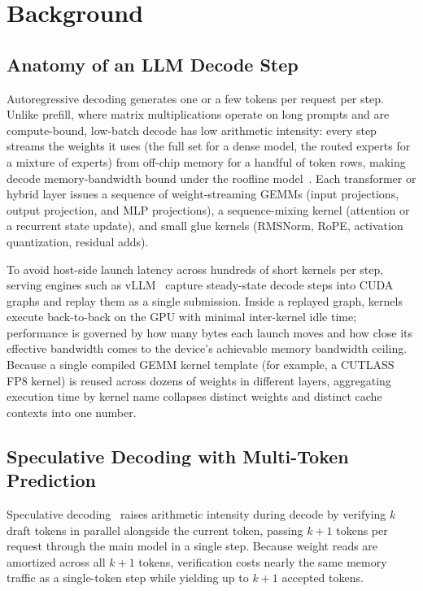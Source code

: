 \section{Background}\label{sec:background}

\subsection{Anatomy of an LLM Decode Step}

Autoregressive decoding generates one or a few tokens per request per step.
Unlike prefill, where matrix multiplications operate on long prompts and are compute-bound,
low-batch decode has low arithmetic intensity: every step streams the weights it uses (the full set for a dense model, the routed experts for a mixture of experts)
from off-chip memory for a handful of token rows, making decode memory-bandwidth bound
under the roofline model~\cite{williams2009roofline}.
Each transformer or hybrid layer issues a sequence of weight-streaming GEMMs
(input projections, output projection, and MLP projections), a sequence-mixing kernel
(attention or a recurrent state update), and small glue kernels (RMSNorm, RoPE,
activation quantization, residual adds).

To avoid host-side launch latency across hundreds of short kernels per step,
serving engines such as vLLM~\cite{kwon2023vllm} capture steady-state decode steps into
CUDA graphs and replay them as a single submission.
Inside a replayed graph, kernels execute back-to-back on the GPU with minimal inter-kernel
idle time; performance is governed by how many bytes each launch moves and how close its
effective bandwidth comes to the device's achievable memory bandwidth ceiling.
Because a single compiled GEMM kernel template (for example, a CUTLASS FP8 kernel)
is reused across dozens of weights in different layers, aggregating execution time by kernel
name collapses distinct weights and distinct cache contexts into one number.

\subsection{Speculative Decoding with Multi-Token Prediction}

Speculative decoding~\cite{leviathan2023fast} raises arithmetic intensity during decode by
verifying $k$ draft tokens in parallel alongside the current token, passing $k{+}1$ tokens
per request through the main model in a single step.
Because weight reads are amortized across all $k{+}1$ tokens, verification costs nearly the
same memory traffic as a single-token step while yielding up to $k{+}1$ accepted tokens.

